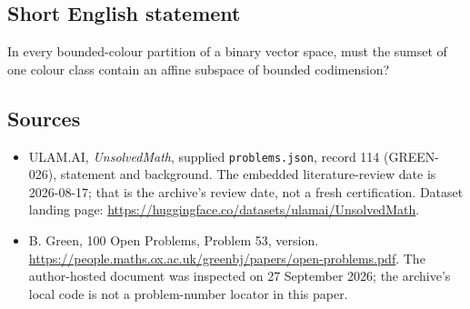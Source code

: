 \documentclass[11pt,a4paper]{article}
\begin{document}
\subsection{Short English statement}

In every bounded-colour partition of a binary vector space, must the sumset of one colour class contain an affine subspace of bounded codimension?

\subsection{Sources}

{\small

\begin{itemize}

\item[\hypertarget{source:114:1}{S1}] ULAM.AI, \emph{UnsolvedMath}, supplied \texttt{problems.json}, record 114 (GREEN-026), statement and background. The embedded literature-review date is 2026-08-17; that is the archive’s review date, not a fresh certification. Dataset landing page: \url{https://huggingface.co/datasets/ulamai/UnsolvedMath}.

\item[\hypertarget{source:114:2}{S2}] B. Green, 100 Open Problems, Problem 53, version. \url{https://people.maths.ox.ac.uk/greenbj/papers/open-problems.pdf}. The author-hosted document was inspected on 27 September 2026; the archive’s local code is not a problem-number locator in this paper.

\end{itemize}

}

\label{end:114}
\end{document}
